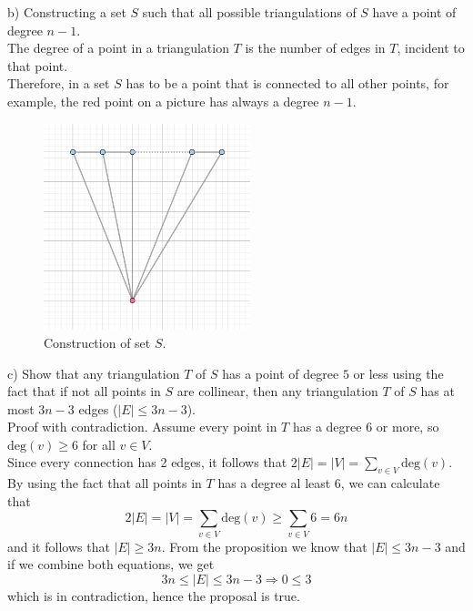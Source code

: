 \documentclass[a4paper,11pt]{article}
\begin{document}
\noindent
b) Constructing a set $S$ such that all possible triangulations of $S$ have a point of degree $n−1$.
\\
The degree of a point in a triangulation $T$ is the number of edges in $T$, incident to that point.
\\
Therefore, in a set $S$ has to be a point that is connected to all other points, for example, the red point on a picture has always a degree $ n - 1$. 

\begin{figure}[ht!] 
    \centering
    \includegraphics[width=60mm]{1b.png}
    \caption{Construction of set $S$.}
\end{figure}


\newpage
\noindent
c) Show that any triangulation $T$ of $S$ has a point of degree $5$ or less using the fact that 
if not all points in $S$ are collinear, then any triangulation $T$ of $S$ has at most $3n−3$ edges ($|E| \leq 3n - 3$).
\\
Proof with contradiction. Assume every point in $T$ has a degree 6 or more, so $\text{deg}(v) \geq 6$ for all $v \in V$.
\\
Since every connection has 2 edges, it follows that $2|E| = |V| = \sum_{v \in V} \text{deg}(v)$.
\\
By using the fact that all points in $T$ has a degree al least 6, we can calculate that
$$ 2|E| = |V| = \sum_{v \in V} \text{deg}(v) \geq \sum_{v \in V} 6 = 6n $$
and it follows that $ |E| \geq 3n $.
From the proposition we know that $|E| \leq 3n - 3$ and if we combine both equations, we get 
$$ 3n \leq |E| \leq 3n - 3 \Rightarrow 0 \leq 3 $$
which is in contradiction, hence the proposal is true.

\end{document}
